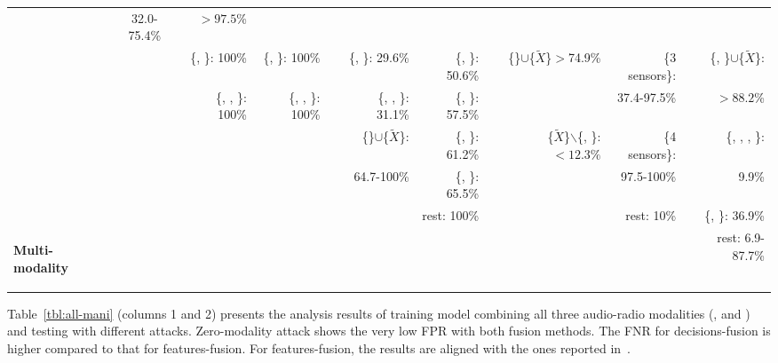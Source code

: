 \begin{table*}[t]
{\begin{tabular}{@{}l c rr c rr c rrr@{}}
                                      & 
32.0-75.4\%                          & 
$>97.5$\% \\
&& 
\{\audio{}, \wifi{}\}: 100\%          & 
\{\bluetooth{}, \wifi{}\}: 100\%      && 
\{\humidity{}, \temperature{}\}: 29.6\% &  
\{\altitude{}, \temperature{}\}: 50.6\% && 
\{\audio{}\}$\cup$\{$\widetilde{X}$\}$>$74.9\%  & 
\{3 sensors\}:                      &
\{\audio{}, \wifi{}\}$\cup$\{$\widetilde{X}$\}: \\
&& 
\{\audio{}, \bluetooth{}, \wifi{}\}: 100\%      &
\{\audio{}, \bluetooth{}, \wifi{}\}: 100\%      && 
\{\gas{}, \humidity{}, \temperature{}\}: 31.1\%   & 
\{\gas{}, \humidity{}\}: 57.5\%               && 
                                               & 
37.4-97.5\%                                    & 
$>88.2$\% \\
&&                              
&                               
&&
\{\altitude{}\}$\cup$\{$\widetilde{X}$\}: & 
\{\altitude{}, \humidity{}\}: 61.2\%          && 
\{$\widetilde{X}$\}$\backslash$\{\audio{}, \bluetooth{}\}:$<12.3\%$      &
\{4 sensors\}:                              &
\{\altitude{}, \gas{}, \humidity{}, \temperature{}\}:\\


&&                              
&
&& 
64.7-100\%&  
\{\altitude{}, \gas{}\}: 65.5\%               && 
                                       & 
97.5-100\%                                   & 
9.9\% \\


&&                              
&
&& 
&
rest: 100\%     &&                    
                &             
rest: 10\%      & 
\colorbox{gray!70}{\{\bluetooth{}, \wifi{}\}: 36.9\%} \\


\multirow{-4}{*}{\begin{rotate}{90} {\bf Multi-modality}\end{rotate}}&&
&                
&&                             
&                          
&&                    
&                  
&
rest: 6.9-87.7\% \\
\bottomrule
\end{tabular}
}
\end{table*}
 


Table~\ref{tbl:all-mani} (columns 1 and 2) presents the analysis results of
training model combining all three audio-radio modalities (\audio, \bluetooth
and \wifi) and testing with different attacks. Zero-modality attack shows the
very low FPR with both fusion methods. The FNR for decisions-fusion is higher
compared to that for features-fusion.
For features-fusion, the results are aligned with the ones reported in~\cite{TruongPerCom14}.

